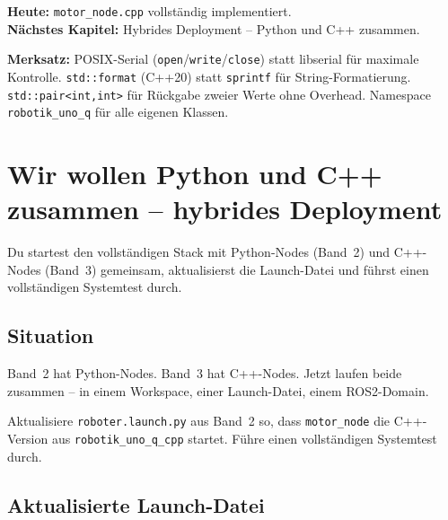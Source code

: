 \begin{projektBox}
\textbf{Heute:} \texttt{motor\_node.cpp} vollständig implementiert.\\
\textbf{Nächstes Kapitel:} Hybrides Deployment -- Python und C++ zusammen.
\end{projektBox}

\begin{merksatzBox}
\textbf{Merksatz:}
POSIX-Serial (\texttt{open}/\texttt{write}/\texttt{close}) statt libserial
für maximale Kontrolle.
\texttt{std::format} (C++20) statt \texttt{sprintf} für String-Formatierung.
\texttt{std::pair<int,int>} für Rückgabe zweier Werte ohne Overhead.
Namespace \texttt{robotik\_uno\_q} für alle eigenen Klassen.
\end{merksatzBox}


\chapter{Wir wollen Python und C++ zusammen –
  hybrides Deployment}

\begin{lernziele}
Du startest den vollständigen Stack mit Python-Nodes (Band~2)
und C++-Nodes (Band~3) gemeinsam, aktualisierst die Launch-Datei
und führst einen vollständigen Systemtest durch.
\end{lernziele}

\section{Situation}

Band~2 hat Python-Nodes.
Band~3 hat C++-Nodes.
Jetzt laufen beide zusammen -- in einem Workspace,
einer Launch-Datei, einem ROS2-Domain.

\begin{aufgabeBox}
Aktualisiere \texttt{roboter.launch.py} aus Band~2 so,
dass \texttt{motor\_node} die C++-Version aus \texttt{robotik\_uno\_q\_cpp} startet.
Führe einen vollständigen Systemtest durch.
\end{aufgabeBox}

\section{Aktualisierte Launch-Datei}

